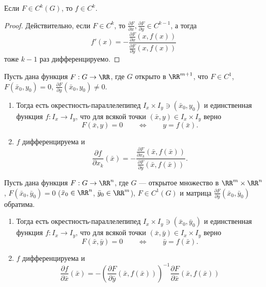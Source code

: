 \documentclass[12pt,a4paper]{article}
\begin{document}
    \begin{corollary}
        Если $F \in C^k(G)$, то $f \in C^k$.
    \end{corollary}

    \begin{proof}
        Действительно, если $F \in C^k$, то $\frac{\partial F}{\partial x}, \frac{\partial F}{\partial y} \in C^{k-1}$, а тогда
        \[
            f'(x) = - \frac{\frac{\partial F}{\partial x}(x, f(x))}{\frac{\partial F}{\partial y}(x, f(x))}
        \]
        тоже $k-1$ раз дифференцируемо. 
    \end{proof}

    \begin{theorem}
        Пусть дана функция $F: G \to \RR$, где $G$ открыто в $\RR^{m+1}$, что $F \in C^1$, $F(\bar{x}_0, y_0) = 0$, $\frac{\partial F}{\partial y}(\bar{x}_0, y_0) \neq 0$.
        \begin{enumerate}
            \item Тогда есть окрестность-параллелепипед $I_x \times I_y \ni (\bar{x}_0, y_0)$ и единственная функция $f: I_x \to I_y$, что для всякой точки $(\bar{x}, y) \in I_x \times I_y$ верно
                \[F(\bar{x}, y) = 0 \qquad \Longleftrightarrow \qquad y = f(\bar{x}).\]
            \item $f$ дифференцируема и
                \[\frac{\partial f}{\partial x_k}(\bar{x}) = - \frac{\frac{\partial F}{\partial x_k}(\bar{x}, f(\bar{x}))}{\frac{\partial F}{\partial y}(\bar{x}, f(\bar{x}))}.\]
        \end{enumerate}
    \end{theorem}

    \begin{theorem}
        Пусть дана функция $F: G \to \RR^n$, где $G$ --- открытое множество в $\RR^m \times \RR^n$, $F(\bar{x}_0, \bar{y}_0) = 0$ ($\bar{x}_0 \in \RR^n$, $\bar{y}_0 \in \RR^m$), $F \in C^1(G)$ и матрица $\frac{\partial F}{\partial \bar{y}}(\bar{x}_0, \bar{y}_0)$ обратима.
        \begin{enumerate}
            \item Тогда есть окрестность-параллелепипед $I_x \times I_y \ni (\bar{x}_0, \bar{y}_0)$ и единственная функция $f: I_x \to I_y$, что для всякой точки $(\bar{x}, \bar{y}) \in I_x \times I_y$ верно
                \[F(\bar{x}, \bar{y}) = 0 \qquad \Longleftrightarrow \qquad \bar{y} = f(\bar{x}).\]
            \item $f$ дифференцируема и
                \[\frac{\partial f}{\partial \bar{x}}(\bar{x}) = - \left(\frac{\partial F}{\partial \bar{y}}(\bar{x}, f(\bar{x}))\right)^{-1} \frac{\partial F}{\partial \bar{x}}(\bar{x}, f(\bar{x}))\]
        \end{enumerate}
    \end{theorem}
\end{document}
